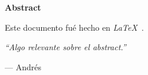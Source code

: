 \begin{center}
\textbf{\large Abstract}
\end{center}

Este documento fu\'{e} hecho en \emph{\LaTeX\ }.

\vspace{1cm}

\emph{``Algo relevante sobre el abstract.''}

\hfill --- Andr\'{e}s
